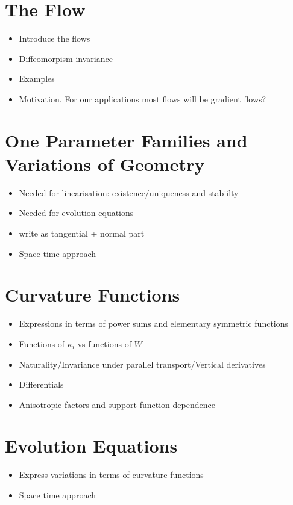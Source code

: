 \chapter{The Flow}

\begin{itemize}
\item Introduce the flows
\item Diffeomorpism invariance
\item Examples
\item Motivation. For our applications most flows will be gradient flows?
\end{itemize}

\chapter{One Parameter Families and Variations of Geometry}

\begin{itemize}
\item Needed for linearisation: existence/uniqueness and stabiilty
\item Needed for evolution equations
\item write as tangential + normal part
\item Space-time approach
\end{itemize}



\chapter{Curvature Functions}

\begin{itemize}
\item Expressions in terms of power sums and elementary symmetric functions
\item Functions of \(\kappa_i\) vs functions of \(W\)
\item Naturality/Invariance under parallel transport/Vertical derivatives
\item Differentials
\item Anisotropic factors and support function dependence
\end{itemize}

\chapter{Evolution Equations}

\begin{itemize}
\item Express variations in terms of curvature functions
\item Space time approach
\end{itemize}

